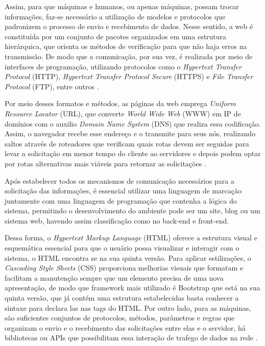 Assim, para que máquinas e humanos, ou apenas máquinas, possam trocar informações, faz-se necessário a utilização de modelos e protocolos que padronizem o processo de envio e recebimento de dados. Nesse sentido, a web é constituída por um conjunto de pacotes organizados em uma estrutura hierárquica, que orienta os métodos de verificação para que não haja erros na transmissão. De modo que a comunicação, por sua vez, é realizada por meio de interfaces de programação, utilizando protocolos como o \textit{Hypertext Transfer Protocol} (HTTP), \textit{Hypertext Transfer Protocol Secure} (HTTPS) e \textit{File Transfer Protocol} (FTP), entre outros \mbox{\cite{b:redes_2017}.}

Por meio desses formatos e métodos, as páginas da web emprega \textit{Uniform Resource Locator} (URL), que converte \textit{World Wide Web} (WWW) em IP de domínios com o auxilio \textit{Domain Name System} (DNS) que realiza essa codificação. Assim, o navegador recebe esse endereço e o transmite para seus nós, realizando saltos através de roteadores que verificam quais rotas devem ser seguidas para levar a solicitação em menor tempo do cliente ao servidores e depois podem optar por rotas alternativas mais viáveis para retornar as solicitações \mbox{\cite{b:redes_2017}.}

Após estabelecer todos os mecanismos de comunicação necessários para a solicitação das informações, é essencial utilizar uma linguagem de marcação juntamente com uma linguagem de programação que contenha a lógica do sistema, permitindo o desenvolvimento do ambiente pode ser um site, blog ou um sistema web, havendo assim classificação como no back-end e front-end.

Dessa forma, o \textit{Hypertext Markup Language} (HTML) oferece a estrutura visual e esquemática essencial para que o usuário possa visualizar e interagir com o sistema, o HTML encontra se na sua quinta versão. Para aplicar estilizações, o \textit{Cascading Style Sheets} (CSS) proporciona melhorias visuais que formatam e facilitam a manutenção sempre que um elemento precisa de uma nova apresentação, de modo que framework mais utilizado é Bootstrap que está na sua quinta versão, que já contém uma estrutura estabelecidas basta conhecer a sintaxe para declara las nas tags do HTML. Por outro lado, para as máquinas, são suficientes conjuntos de protocolos, métodos, parâmetros e regras que organizam o envio e o recebimento das solicitações entre elas e o servidor, há bibliotecas ou APIs que possibilitam essa interação de trafego de dados na rede \mbox{\cite{a:api_redes_industria_v4_2024}.}

